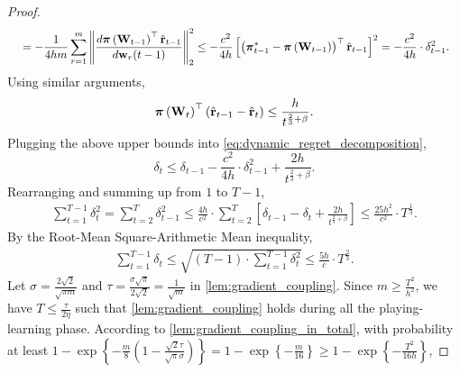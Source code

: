 \begin{proof}
\begin{equation*}
\begin{split}
    &\quad = - \frac{1}{4 h m} \sum\limits_{r=1}^{m}{ \left\| \frac{d {\boldsymbol{\pi}}\left( {\mathbf{W}}_{t-1} \right)^\top \hat{{\mathbf{r}}}_{t-1}}{d {\mathbf{w}}_r(t-1)} \right\|_2^2 } \le - \frac{c^2}{4 h} \left[ \left( {{\boldsymbol{\pi}}_{t-1}^*} - {\boldsymbol{\pi}}\left( {\mathbf{W}}_{t-1} \right) \right)^\top \hat{{\mathbf{r}}}_{t-1}  \right]^2 = - \frac{c^2}{4 h} \cdot \delta_{t-1}^2.
\end{split}
\end{equation*}
Using similar arguments,
\begin{equation*}
    {\boldsymbol{\pi}}\left( {\mathbf{W}}_t \right)^\top \left( \hat{{\mathbf{r}}}_{t-1} - \hat{{\mathbf{r}}}_t  \right) \le \frac{ h }{t^{\frac{2}{3} + \beta}}.
\end{equation*}
Plugging the above upper bounds into \cref{eq:dynamic_regret_decomposition},
\begin{equation*}
    \delta_t \le \delta_{t-1} - \frac{c^2}{4 h} \cdot \delta_{t-1}^2 + \frac{ 2 h }{t^{\frac{2}{3} + \beta}}.
\end{equation*}
Rearranging and summing up from $1$ to $T-1$,
\begin{equation*}
\begin{split}
    \sum\limits_{t=1}^{T-1}{\delta_{t}^2} = \sum\limits_{t=2}^{T}{\delta_{t-1}^2} \le \frac{4 h}{ c^2} \cdot  \sum\limits_{t=2}^{T} { \left[ \delta_{t-1} - \delta_t + \frac{ 2 h }{t^{\frac{2}{3} + \beta}} \right] } \le \frac{25 h^2}{ c^2} \cdot T^{\frac{1}{3}}.
\end{split}
\end{equation*}
By the Root-Mean Square-Arithmetic Mean inequality,
\begin{equation*}
\begin{split}
    \sum\limits_{t=1}^{T-1}{\delta_{t}} \le \sqrt{\left(T  - 1 \right) \cdot \sum\limits_{t=1}^{T-1}{\delta_{t}^2}} \le \frac{5 h}{c} \cdot  T^{\frac{2}{3}}.
\end{split}
\end{equation*}
Let $\sigma = \frac{2 \sqrt{2}}{\sqrt{\pi m}}$ and $\tau = \frac{\sigma \sqrt{\pi}}{2 \sqrt{2}} = \frac{1}{\sqrt{m}}$ in \cref{lem:gradient_coupling}. Since $m \ge \frac{T^2}{h^2}$, we have $T \le \frac{\tau}{2 \eta}$ such that \cref{lem:gradient_coupling} holds during all the playing-learning phase. According to \cref{lem:gradient_coupling_in_total}, with probability at least $1 - \exp\left\{ - \frac{m}{8} \left( 1 - \frac{\sqrt{2}\tau}{\sqrt{\pi}\sigma} \right) \right\} = 1 - \exp\left\{ - \frac{m}{16} \right\} \ge 1 - \exp\left\{ - \frac{T^2}{16 h} \right\}$,
\end{proof}

